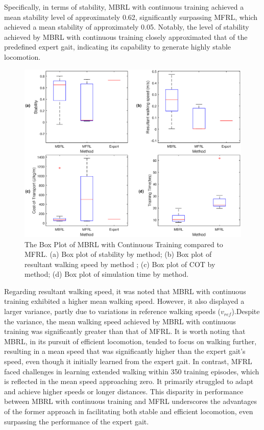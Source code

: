 Specifically, in terms of stability, MBRL with continuous training achieved a mean stability level of approximately 0.62, significantly surpassing MFRL, which achieved a mean stability of approximately 0.05. Notably, the level of stability achieved by MBRL with continuous training closely approximated that of the predefined expert gait, indicating its capability to generate highly stable locomotion. 
\begin{figure}[htb]
    \centering
    \includegraphics[width=\linewidth]{img/chap5/box_results.eps}
    \caption{The Box Plot of MBRL with Continuous Training compared to MFRL. (a) Box plot of stability by method; (b) Box plot of resultant walking speed by method ; (c) Box plot of COT by method; (d) Box plot of simulation time by method.}
    \label{fig:box}
\end{figure}

Regarding resultant walking speed, it was noted that MBRL with continuous training exhibited a higher mean walking speed. However, it also displayed a larger variance, partly due to variations in reference walking speeds ($v_{ref}$).Despite the variance, the mean walking speed achieved by MBRL with continuous training was significantly greater than that of MFRL. It is worth noting that MBRL, in its pursuit of efficient locomotion, tended to focus on walking further, resulting in a mean speed that was significantly higher than the expert gait's speed, even though it initially learned from the expert gait. In contrast, MFRL faced challenges in learning extended walking within 350 training episodes, which is reflected in the mean speed approaching zero. It primarily struggled to adapt and achieve higher speeds or longer distances. This disparity in performance between MBRL with continuous training and MFRL underscores the advantages of the former approach in facilitating both stable and efficient locomotion, even surpassing the performance of the expert gait. 

